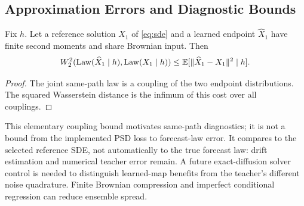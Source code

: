 \subsection{Approximation Errors and Diagnostic Bounds}
\begin{proposition}
Fix $h$. Let a reference solution $X_1$ of \eqref{eq:sde} and a learned endpoint $\widehat X_1$ have finite second moments and share Brownian input. Then
\begin{equation}
 W_2^2(\operatorname{Law}(\widehat X_1\mid h),\operatorname{Law}(X_1\mid h))
 \leq\mathbb{E}[\|\widehat X_1-X_1\|^2\mid h].
\end{equation}
\end{proposition}
\begin{proof}
The joint same-path law is a coupling of the two endpoint distributions. The squared Wasserstein distance is the infimum of this cost over all couplings.
\end{proof}
This elementary coupling bound motivates same-path diagnostics; it is not a bound from the implemented PSD loss to forecast-law error. It compares to the selected reference SDE, not automatically to the true forecast law: drift estimation and numerical teacher error remain. A future exact-diffusion solver control is needed to distinguish learned-map benefits from the teacher's different noise quadrature. Finite Brownian compression and imperfect conditional regression can reduce ensemble spread.

